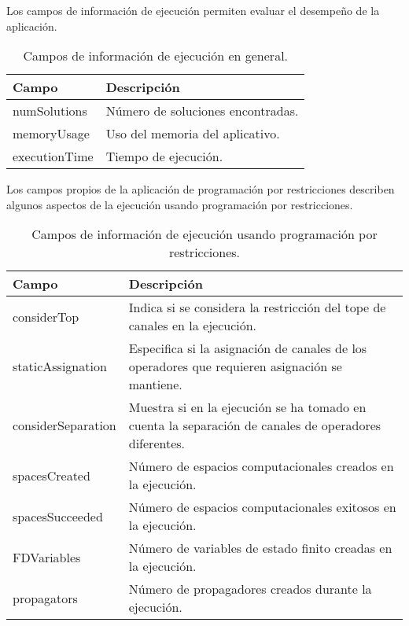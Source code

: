 Los campos de información de ejecución permiten evaluar el desempeño de la aplicación.

\begin{center}
\begin{longtable}{|p{7cm}|p{7cm}|}
	\caption{Campos de información de ejecución en general.}\\
	\hline
	\cellcolor[gray]{0.9} \textbf{Campo} & \cellcolor[gray]{0.9}\textbf{Descripción} \\
	\hline
	numSolutions & Número de soluciones encontradas.\\
	\hline
	memoryUsage & Uso del memoria del aplicativo.\\
	\hline
	executionTime & Tiempo de ejecución.\\
	\hline
\end{longtable}	
\end{center}

Los campos propios de la aplicación de programación por restricciones describen algunos aspectos de la ejecución usando programación por restricciones.
\newpage
\begin{center}
\begin{longtable}{|p{7cm}|p{9cm}|}
	\caption{Campos de información de ejecución usando programación por restricciones.}\\
	\hline
	\cellcolor[gray]{0.9} \textbf{Campo} & \cellcolor[gray]{0.9}\textbf{Descripción} \\
	\hline
	considerTop & Indica si se considera la restricción del tope de canales en la ejecución.\\
	\hline
	staticAssignation & Especifica si la asignación de canales de los operadores que requieren asignación se mantiene.\\
	\hline
	considerSeparation & Muestra si en la ejecución se ha tomado en cuenta la separación de canales de operadores diferentes.\\
	\hline
	spacesCreated & Número de espacios computacionales creados en la ejecución.\\
	\hline
	spacesSucceeded & Número de espacios computacionales exitosos en la ejecución.\\
	\hline
	FDVariables & Número de variables de estado finito creadas en la ejecución.\\
	\hline
	propagators & Número de propagadores creados durante la ejecución.\\
	\hline
\end{longtable}	
\end{center}

